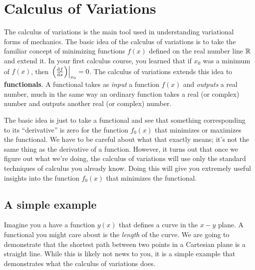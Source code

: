 \section{Calculus of Variations}
\label{sec:calc_var}

The calculus of variations is the main tool used in understanding variational forms of mechanics. The basic idea of the calculus of variations is to take the familiar concept of minimizing functions $f(x)$ defined on the real number line $\mathbb{R}$ and extend it. In your first calculus course, you learned that if $x_0$ was a minimum of $f(x)$, then $\eval{\qty(\dv{f}{x})}_{x_0} = 0$. 
The calculus of variations extends this idea to \textbf{functionals}. A functional takes as \emph{input} a function $f(x)$ and \emph{outputs} a real number, much in the same way an ordinary function takes a real (or complex) number and outputs another real (or complex) number.

The basic idea is just to take a functional and see that something corresponding to its ``derivative'' is zero for the function $f_0(x)$ that minimizes or maximizes the functional. We have to be careful about what that exactly means; it's not the same thing as the derivative of a function. However, it turns out that once we figure out what we're doing, the calculus of variations will use only the standard techniques of calculus you already know. Doing this will give you extremely useful insights into the function $f_0(x)$ that minimizes the functional. 


\subsection{A simple example}
Imagine you a have a function $y(x)$ that defines a curve in the $x-y$ plane. A functional you might care about is the \emph{length} of the curve. We are going to demonstrate that the shortest path between two points in a Cartesian plane is a straight line. While this is likely not news to you, it is a simple example that demonstrates what the calculus of variations does.

